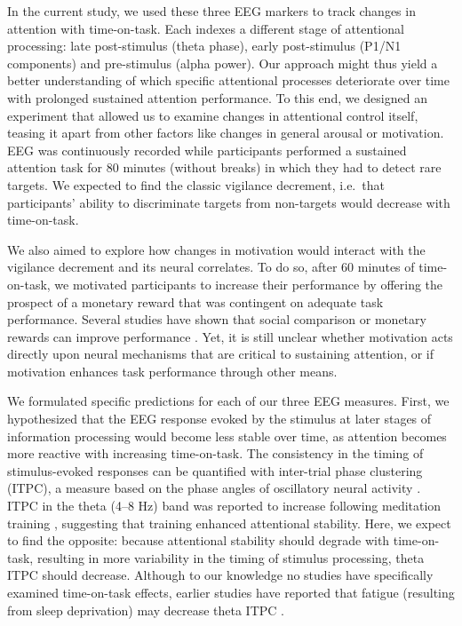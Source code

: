 \documentclass[11pt,]{memoir}
\begin{document}
In the current study, we used these three EEG markers to track changes in attention with time-on-task. Each indexes a different stage of attentional processing: late post-stimulus (theta phase), early post-stimulus (P1/N1 components) and pre-stimulus (alpha power). Our approach might thus yield a better understanding of which specific attentional processes deteriorate over time with prolonged sustained attention performance. To this end, we designed an experiment that allowed us to examine changes in attentional control itself, teasing it apart from other factors like changes in general arousal or motivation. EEG was continuously recorded while participants performed a sustained attention task for 80 minutes (without breaks) in which they had to detect rare targets. We expected to find the classic vigilance decrement, i.e.~that participants' ability to discriminate targets from non-targets would decrease with time-on-task.

We also aimed to explore how changes in motivation would interact with the vigilance decrement and its neural correlates. To do so, after 60 minutes of time-on-task, we motivated participants to increase their performance by offering the prospect of a monetary reward that was contingent on adequate task performance. Several studies have shown that social comparison or monetary rewards can improve performance \autocites{Bonnefond2011}{Hopstaken2015}{Boksem2006}{Lorist2009}. Yet, it is still unclear whether motivation acts directly upon neural mechanisms that are critical to sustaining attention, or if motivation enhances task performance through other means.

We formulated specific predictions for each of our three EEG measures. First, we hypothesized that the EEG response evoked by the stimulus at later stages of information processing would become less stable over time, as attention becomes more reactive with increasing time-on-task. The consistency in the timing of stimulus-evoked responses can be quantified with inter-trial phase clustering (ITPC), a measure based on the phase angles of oscillatory neural activity \autocite{VanRullen2011}. ITPC in the theta (4--8 Hz) band was reported to increase following meditation training \autocites{Lutz2009}{Slagter2009}, suggesting that training enhanced attentional stability. Here, we expect to find the opposite: because attentional stability should degrade with time-on-task, resulting in more variability in the timing of stimulus processing, theta ITPC should decrease. Although to our knowledge no studies have specifically examined time-on-task effects, earlier studies have reported that fatigue (resulting from sleep deprivation) may decrease theta ITPC \autocites{Eidelman-Rothman2018}{Hoedlmoser2011}.
\end{document}
